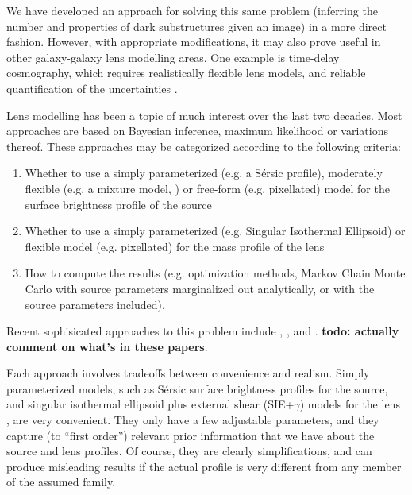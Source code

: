 \documentclass[useAMS,usenatbib]{mn2e}
\begin{document}
We have developed an approach for solving this same problem (inferring the
number and properties of dark substructures given an image) in a more direct
fashion. However, with appropriate modifications, it may also prove useful in other
galaxy-galaxy lens modelling areas. One example is time-delay cosmography, which
requires realistically flexible lens models, and reliable quantification
of the uncertainties
\citep{2013ApJ...766...70S, 2014ApJ...788L..35S, grillo}.

Lens modelling has been a topic of much interest over the last two decades.
Most approaches are based on Bayesian inference, maximum likelihood or
variations thereof. These approaches may be categorized according to the
following criteria:
\begin{enumerate}
\item Whether to use a simply parameterized (e.g. a Sérsic profile),
moderately flexible (e.g. a mixture model, \citet{2011MNRAS.412.2521B})
or free-form (e.g. pixellated) model for the surface brightness profile of the source
\item Whether to use a simply parameterized (e.g. Singular Isothermal Ellipsoid)
or flexible model (e.g. pixellated) for the mass profile of the lens
\item How to compute the results (e.g. optimization methods, Markov Chain
Monte Carlo with source parameters marginalized out analytically, or
with the source parameters included).
\end{enumerate}

Recent sophisicated approaches to
this problem include \citet{2014MNRAS.445.2181C},
\citet{2015arXiv150500198T}, and
\citet{2015arXiv150407629B}. {\bf todo: actually comment
on what's in these papers}.

Each approach involves tradeoffs between convenience and realism.
Simply parameterized models, such as Sérsic surface
brightness profiles for the source,
and singular isothermal ellipsoid plus
external shear (SIE+$\gamma$) models for the lens \citep{1994A&A...284..285K},
are very
convenient. They only have a few adjustable parameters, and they capture
(to ``first order'') relevant prior information that we have about the
source and lens profiles. Of course, they are clearly simplifications,
and can produce misleading results if the actual profile is very different
from any member of the assumed family.
\end{document}
